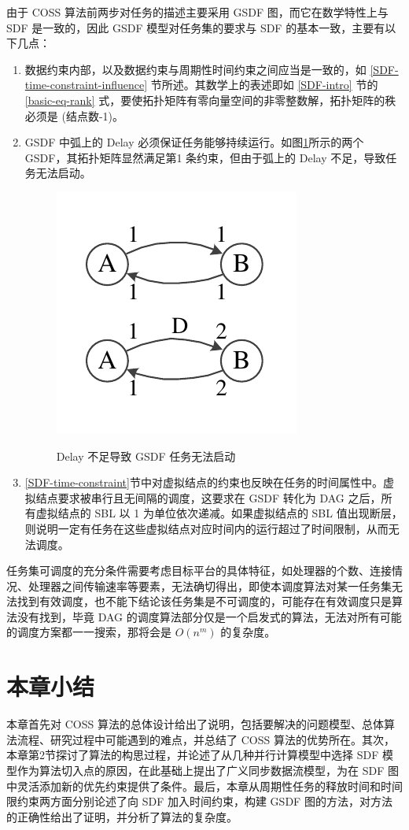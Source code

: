 由于 COSS 算法前两步对任务的描述主要采用 GSDF 图，而它在数学特性上与 SDF 是一致的，因此 GSDF 模型对任务集的要求与 SDF 的基本一致，主要有以下几点：
\begin{enumerate}
  \item 数据约束内部，以及数据约束与周期性时间约束之间应当是一致的，如 \ref{SDF-time-constraint-influence} 节所述。其数学上的表述即如 \ref{SDF-intro} 节的 \eqref{basic-eq-rank} 式，要使拓扑矩阵有零向量空间的非零整数解，拓扑矩阵的秩必须是 (结点数-1)。
  \item GSDF 中弧上的 Delay 必须保证任务能够持续运行。如图\ref{SDF-fig-requirement}所示的两个 GSDF，其拓扑矩阵显然满足第1 条约束，但由于弧上的 Delay 不足，导致任务无法启动。
\begin{figure}[!hbt]
  \centering
  \includegraphics[height=22ex]{figure/SDF-requirement.pdf}\\
  \caption{Delay 不足导致 GSDF 任务无法启动}\label{SDF-fig-requirement}
\end{figure}

  \item \ref{SDF-time-constraint}节中对虚拟结点的约束也反映在任务的时间属性中。虚拟结点要求被串行且无间隔的调度，这要求在 GSDF 转化为 DAG 之后，所有虚拟结点的 SBL 以 1 为单位依次递减。如果虚拟结点的 SBL 值出现断层，则说明一定有任务在这些虚拟结点对应时间内的运行超过了时间限制，从而无法调度。
\end{enumerate}

任务集可调度的充分条件需要考虑目标平台的具体特征，如处理器的个数、连接情况、处理器之间传输速率等要素，无法确切得出，即使本调度算法对某一任务集无法找到有效调度，也不能下结论该任务集是不可调度的，可能存在有效调度只是算法没有找到，毕竟 DAG 的调度算法部分仅是一个启发式的算法，无法对所有可能的调度方案都一一搜索，那将会是 $O(n^m)$ 的复杂度。

\section{本章小结}

本章首先对 COSS 算法的总体设计给出了说明，包括要解决的问题模型、总体算法流程、研究过程中可能遇到的难点，并总结了 COSS 算法的优势所在。其次，本章第2节探讨了算法的构思过程，并论述了从几种并行计算模型中选择 SDF 模型作为算法切入点的原因，在此基础上提出了广义同步数据流模型，为在 SDF 图中灵活添加新的优先约束提供了条件。最后，本章从周期性任务的释放时间和时间限约束两方面分别论述了向 SDF 加入时间约束，构建 GSDF 图的方法，对方法的正确性给出了证明，并分析了算法的复杂度。

